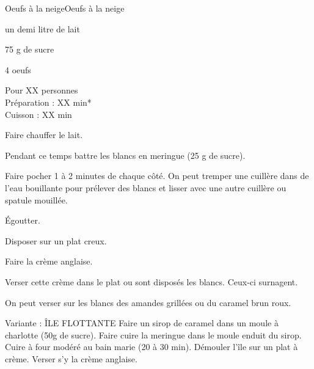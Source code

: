 \begin{recette}{Oeufs à la neige}{Oeufs à la neige}

\begin{ingredients}
un demi litre de lait\par
75 g de sucre\par
4 oeufs\par
\end{ingredients}

\begin{infos}
Pour XX personnes\\
Préparation : XX min*	\\
Cuisson : XX min\\
\end{infos}

\begin{etapes}
\item Faire chauffer le lait.
\item Pendant ce temps battre les blancs en meringue (25 g de sucre).
\item Faire pocher 1 à 2 minutes de chaque côté. On peut tremper une cuillère dans de l'eau bouillante pour prélever des blancs et lisser avec une autre cuillère ou spatule mouillée.
\item Égoutter.
\item Disposer sur un plat creux.
\item Faire la crème anglaise.
\item Verser cette crème dans le plat ou sont disposés les blancs. Ceux-ci surnagent.
\item On peut verser sur les blancs des amandes grillées ou du caramel brun roux.
\end{etapes}

\begin{conseils}
Variante : ÎLE FLOTTANTE
Faire un sirop de caramel dans un moule à charlotte (50g de sucre).
Faire cuire la meringue dans le moule enduit du sirop.
Cuire à four modéré au bain marie (20 à 30 min).
Démouler l’île sur un plat à crème.
Verser s’y la crème anglaise.
\end{conseils}

\end{recette}